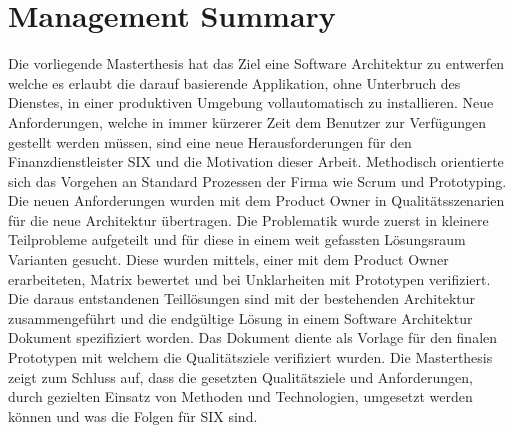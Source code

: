 \chapter{Management Summary}

Die vorliegende Masterthesis hat das Ziel eine Software Architektur zu entwerfen welche es erlaubt die darauf basierende Applikation, ohne Unterbruch des Dienstes, in einer produktiven Umgebung vollautomatisch zu installieren.\newline\newline
Neue Anforderungen, welche in immer kürzerer Zeit dem Benutzer zur Verfügungen gestellt werden müssen, sind eine neue Herausforderungen für den Finanzdienstleister SIX und die Motivation dieser Arbeit.\newline\newline
Methodisch orientierte sich das Vorgehen an Standard Prozessen der Firma wie Scrum und Prototyping. Die neuen Anforderungen wurden mit dem Product Owner in Qualitätsszenarien für die neue Architektur übertragen. Die Problematik wurde zuerst in kleinere Teilprobleme aufgeteilt und für diese in einem weit gefassten Lösungsraum Varianten gesucht. Diese wurden mittels, einer mit dem Product Owner erarbeiteten, Matrix bewertet und bei Unklarheiten mit Prototypen verifiziert. Die daraus entstandenen Teillösungen sind mit der bestehenden Architektur zusammengeführt und die endgültige Lösung in einem Software Architektur Dokument spezifiziert worden. Das Dokument diente als Vorlage für den finalen Prototypen mit welchem die Qualitätsziele verifiziert wurden.\newline\newline
Die Masterthesis zeigt zum Schluss auf, dass die gesetzten Qualitätsziele und Anforderungen, durch gezielten Einsatz von Methoden und Technologien, umgesetzt werden können und was die Folgen für SIX sind.